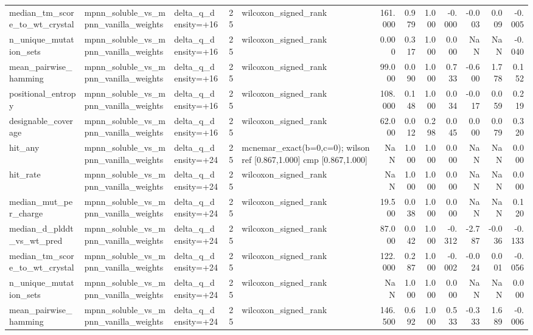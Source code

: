 \begin{table}
{\begin{tabular}{lllrlrrrrrrr}
median\_tm\_score\_to\_wt\_crystal & mpnn\_soluble\_vs\_mpnn\_vanilla\_weights & delta\_q\_density=+16 & 25 & wilcoxon\_signed\_rank & 161.000 & 0.979 & 1.000 & -0.000 & -0.003 & 0.009 & -0.005 \\
n\_unique\_mutation\_sets & mpnn\_soluble\_vs\_mpnn\_vanilla\_weights & delta\_q\_density=+16 & 25 & wilcoxon\_signed\_rank & 0.000 & 0.317 & 1.000 & 0.000 & NaN & NaN & -0.040 \\
mean\_pairwise\_hamming & mpnn\_soluble\_vs\_mpnn\_vanilla\_weights & delta\_q\_density=+16 & 25 & wilcoxon\_signed\_rank & 99.000 & 0.090 & 1.000 & 0.733 & -0.600 & 1.778 & 0.152 \\
positional\_entropy & mpnn\_soluble\_vs\_mpnn\_vanilla\_weights & delta\_q\_density=+16 & 25 & wilcoxon\_signed\_rank & 108.000 & 0.148 & 1.000 & 0.034 & -0.017 & 0.059 & 0.219 \\
designable\_coverage & mpnn\_soluble\_vs\_mpnn\_vanilla\_weights & delta\_q\_density=+16 & 25 & wilcoxon\_signed\_rank & 62.000 & 0.012 & 0.298 & 0.045 & 0.000 & 0.079 & 0.320 \\
hit\_any & mpnn\_soluble\_vs\_mpnn\_vanilla\_weights & delta\_q\_density=+24 & 25 & mcnemar\_exact(b=0,c=0); wilson ref [0.867,1.000] cmp [0.867,1.000] & NaN & 1.000 & 1.000 & 0.000 & NaN & NaN & 0.000 \\
hit\_rate & mpnn\_soluble\_vs\_mpnn\_vanilla\_weights & delta\_q\_density=+24 & 25 & wilcoxon\_signed\_rank & NaN & 1.000 & 1.000 & 0.000 & NaN & NaN & 0.000 \\
median\_mut\_per\_charge & mpnn\_soluble\_vs\_mpnn\_vanilla\_weights & delta\_q\_density=+24 & 25 & wilcoxon\_signed\_rank & 19.500 & 0.038 & 1.000 & 0.000 & NaN & NaN & 0.120 \\
median\_d\_plddt\_vs\_wt\_pred & mpnn\_soluble\_vs\_mpnn\_vanilla\_weights & delta\_q\_density=+24 & 25 & wilcoxon\_signed\_rank & 87.000 & 0.042 & 1.000 & -0.312 & -2.787 & -0.036 & -0.133 \\
median\_tm\_score\_to\_wt\_crystal & mpnn\_soluble\_vs\_mpnn\_vanilla\_weights & delta\_q\_density=+24 & 25 & wilcoxon\_signed\_rank & 122.000 & 0.287 & 1.000 & -0.002 & -0.024 & 0.001 & -0.056 \\
n\_unique\_mutation\_sets & mpnn\_soluble\_vs\_mpnn\_vanilla\_weights & delta\_q\_density=+24 & 25 & wilcoxon\_signed\_rank & NaN & 1.000 & 1.000 & 0.000 & NaN & NaN & 0.000 \\
mean\_pairwise\_hamming & mpnn\_soluble\_vs\_mpnn\_vanilla\_weights & delta\_q\_density=+24 & 25 & wilcoxon\_signed\_rank & 146.500 & 0.692 & 1.000 & 0.533 & -0.333 & 1.689 & -0.006 \\

\end{tabular}}
\end{table}
